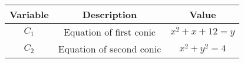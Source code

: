 \begin{tabular}[12pt]{ |c| c| c|}
    \hline
    \textbf{Variable} & \textbf{Description} & \textbf{Value}\\
	\hline
	$C_1$ & Equation of first conic & $x^2 + x + 12 = y$\\
	\hline
	$C_2$ & Equation of second conic & $x^2 + y^2 = 4$\\
	\hline
\end{tabular}